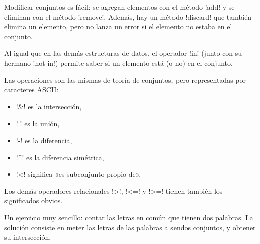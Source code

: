 \documentclass[10pt]{article}
\begin{document}
  Modificar conjuntos es fácil:
  se agregan elementos con el método \li!add!
  y se eliminan con el método \li!remove!.
  Además,
  hay un método \li!discard! que también elimina un elemento,
  pero no lanza un error si el elemento no estaba en el conjunto.

  Al igual que en las demás estructuras de datos,
  el operador \li!in! (junto con su hermano \li!not in!)
  permite saber si un elemento está (o no) en el conjunto.


  Las operaciones son las mismas de teoría de conjuntos,
  pero representadas por caracteres ASCII:
  \begin{itemize}
    \item \li!&! es la intersección,
    \item \li!|! es la unión,
    \item \li!-! es la diferencia,
    \item \li!^! es la diferencia simétrica,
    \item \li!<! significa «es subconjunto propio de».
  \end{itemize}
  Los demás operadores relacionales \li!>!, \li!<=! y \li!>=!
  tienen también los significados obvios.


  Un ejercicio muy sencillo: contar las letras en común que tienen dos palabras.
  La solución consiste en meter las letras de las palabras a sendos conjuntos, y obtener su intersección.
\end{document}

